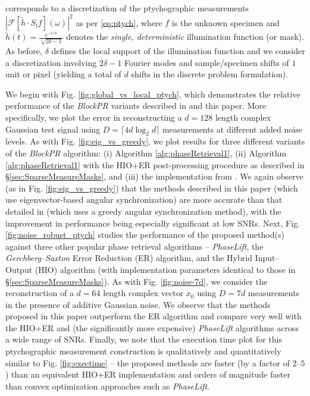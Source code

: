 corresponds to a discretization of the ptychographic measurements $\left|\mathcal{F}[\widetilde h
\cdot S_l f](\omega) \right|^2$ as per \eqref{eq:ptych}, where $f$ is the unknown specimen and
$\widetilde h(t) = \frac{e^{-t/a}}{\sqrt[4]{2\delta -1}}$ denotes the {\em single, deterministic}
illumination function (or mask). As before, $\delta$ defines the local support of the illumination
function and we consider a discretization involving $2\delta-1$ Fourier modes and sample/specimen
shifts of $1$ unit or pixel (yielding a total of $d$ shifts in the discrete problem formulation). 

We begin with Fig. \ref{fig:global_vs_local_ptych}, which demonstrates the relative performance of
the {\em BlockPR} variants described in \cite{IVW2015_FastPhase} and this paper. More specifically,
we plot the error in reconstructing a $d=128$ length complex Gaussian test signal using $D = \lceil
4d\log_2 d\rceil$ measurements at different added noise levels. As with Fig.
\ref{fig:eig_vs_greedy}, we plot results for three different variants of the {\em BlockPR}
algorithm: (i) Algorithm \ref{alg:phaseRetrieval1}, (ii) Algorithm \ref{alg:phaseRetrieval1} with
the HIO+ER post-processing procedure as described in \S \ref{sec:SparseMeasureMasks}, and (iii) the implementation
from \cite{IVW2015_FastPhase}. We again observe (as in Fig. \ref{fig:eig_vs_greedy}) that the methods
described in this paper (which use eigenvector-based angular synchronization) are more accurate than
that detailed in \cite{IVW2015_FastPhase} (which uses a greedy angular synchronization method), with
the improvement in performance being especially significant at low SNRs. Next, Fig.
\ref{fig:noise_robust_ptych} studies the performance of the proposed method(s) against three other
popular phase retrieval algorithms -- {\em PhaseLift}, the {\em Gerchberg--Saxton} Error Reduction
(ER) algorithm, and the Hybrid Input--Output (HIO) algorithm (with implementation parameters identical to those in 
\S \ref{sec:SparseMeasureMasks}). As with Fig. \ref{fig:noise-7d}, we
consider the reconstruction of a $d = 64$ length complex vector $x_0$ using $D = 7d$ measurements in
the presence of additive Gaussian noise. We observe that the methods proposed in this paper outperform the 
ER algorithm and compare very well with the HIO+ER and (the significantly more expensive) {\em PhaseLift} 
algorithms across a wide range of SNRs. 
Finally, we note that the execution time plot for this
ptychographic measurement construction is qualitatively and quantitatively similar to Fig.
\ref{fig:exectime} -- the proposed methods are faster (by a factor of $2$--$5$) than an equivalent HIO+ER
implementation and orders of magnitude faster than convex optimization approaches such as {\em
PhaseLift}. 

